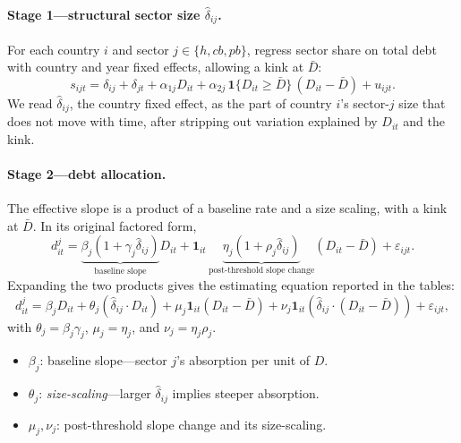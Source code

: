 \documentclass[\latexroot/\projectname]{subfiles}
\begin{document}
\paragraph{Stage 1---structural sector size $\hat\delta_{ij}$.}
For each country $i$ and sector $j\in\{h,cb,pb\}$, regress sector
share on total debt with country and year fixed effects, allowing a
kink at $\bar D$:
\begin{equation}\label{eq:stage1}
s_{ijt}=\delta_{ij}+\delta_{jt}
       +\alpha_{1j}D_{it}
       +\alpha_{2j}\,\mathbf{1}\{D_{it}\!\ge\!\bar D\}\,(D_{it}-\bar D)
       +u_{ijt}.
\end{equation}
We read $\hat\delta_{ij}$, the country fixed effect, as the part of
country $i$'s sector-$j$ size that does not move with time, after
stripping out variation explained by $D_{it}$ and the kink.

\paragraph{Stage 2---debt allocation.}
The effective slope is a product of a baseline rate and a size
scaling, with a kink at $\bar D$. In its original factored form,
\begin{equation}\label{eq:stage2-factored}
d^j_{it}
= \underbrace{\beta_j\!\left(1+\gamma_j\hat\delta_{ij}\right)}_{\text{baseline slope}} D_{it}
+ \mathbf{1}_{it}\,
  \underbrace{\eta_j\!\left(1+\rho_j\hat\delta_{ij}\right)}_{\text{post-threshold slope change}}
  (D_{it}-\bar D)
+ \varepsilon_{ijt}.
\end{equation}
Expanding the two products gives the estimating equation reported in
the tables:
\begin{equation}\label{eq:stage2}
d^j_{it}=\beta_j D_{it}
        +\theta_j(\hat\delta_{ij}\!\cdot\! D_{it})
        +\mu_j\mathbf{1}_{it}(D_{it}-\bar D)
        +\nu_j\mathbf{1}_{it}(\hat\delta_{ij}\!\cdot\!(D_{it}-\bar D))
        +\varepsilon_{ijt},
\end{equation}
with $\theta_j=\beta_j\gamma_j$, $\mu_j=\eta_j$, and
$\nu_j=\eta_j\rho_j$.
\begin{itemize}
  \item $\beta_j$: baseline slope---sector $j$'s absorption per unit
        of $D$.
  \item $\theta_j$: \emph{size-scaling}---larger $\hat\delta_{ij}$
        implies steeper absorption.
  \item $\mu_j,\nu_j$: post-threshold slope change and its
        size-scaling.
\end{itemize}
\end{document}

